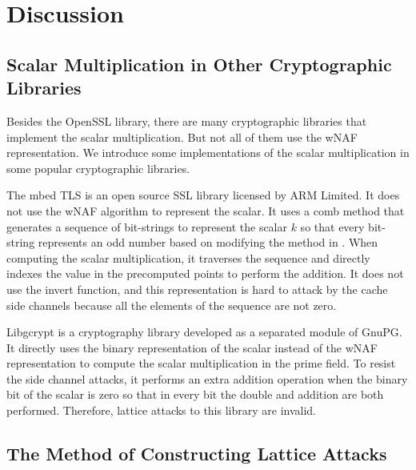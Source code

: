 \section{Discussion}
\label{sec:discussion}

\subsection{Scalar Multiplication in Other Cryptographic Libraries}
Besides the OpenSSL library, there are many cryptographic libraries that implement the scalar multiplication.
But not all of them use the wNAF representation.
We introduce some implementations of the scalar multiplication in some popular cryptographic libraries.

The mbed TLS \cite{polarssl} is an open source SSL library licensed by ARM Limited.
It does not use the wNAF algorithm to represent the scalar.
It uses a comb method that generates a sequence of bit-strings to represent the scalar $k$ so that every bit-string represents an odd number based on modifying the method in \cite{Hedabou2004ACM}.
When computing the scalar multiplication, it traverses the sequence and directly indexes the value in the precomputed points to perform the addition.
It does not use the invert function,
and this representation is hard to attack by the cache side channels because all the elements of the sequence are not zero.

Libgcrypt \cite{libgcrypt} is a cryptography library developed as a separated module of GnuPG.
It directly uses the binary representation of the scalar instead of the wNAF representation to compute the scalar multiplication in the prime field.
To resist the side channel attacks, it performs an extra addition operation when the binary bit of the scalar is zero so that in every bit the double and addition are both performed.
Therefore, lattice attacks to this library are invalid.


\subsection{The Method of Constructing Lattice Attacks}





















